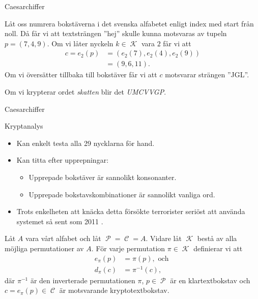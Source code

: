 \documentclass{beamer}
\theoremstyle{definition}
\DeclareMathOperator{\p}{\mathcal{P}}
\let\P\p
\DeclareMathOperator{\C}{\mathcal{C}}
\DeclareMathOperator{\K}{\mathcal{K}}
\let\stoch\mathbf
\renewcommand{\p}{\stoch P}
\begin{document}
\begin{frame}{\insertsubsectionhead}{Caesarchiffer}
  \begin{example}\label{ex:shiftdef}
    Låt oss numrera bokstäverna i det svenska alfabetet enligt index med start 
    från noll.
    Då får vi att textsträngen ''hej'' skulle kunna motsvaras av tupeln \(p 
    = (7, 4, 9)\).
    Om vi låter nyckeln \(k\in \K\) vara \(2\) får vi att
    \begin{align}
      \nonumber
      c = e_2(p) &= (e_2(7), e_2(4), e_2(9)) \\
      \nonumber
        &= (9, 6, 11).
    \end{align}
    Om vi översätter tillbaka till bokstäver får vi att \(c\) motsvarar 
    strängen ''JGL''.
  \end{example}

  \begin{example}
    \label{ex:CaesarSkatten}
    Om vi krypterar ordet \emph{skatten} blir det \emph{UMCVVGP}.
  \end{example}
\end{frame}

\begin{frame}{\insertsubsectionhead}{Caesarchiffer}
  \begin{block}{Kryptanalys}
    \begin{itemize}
      \item Kan enkelt testa alla 29 nycklarna för hand.

      \item Kan titta efter upprepningar:
        \begin{itemize}
          \item Upprepade bokstäver är sannolikt konsonanter.
          \item Upprepade bokstavskombinationer är sannolikt vanliga ord.
        \end{itemize}

      \item Trots enkelheten att knäcka detta försökte terrorister seriöst att 
        använda systemet så sent som 2011 \cite{Register2011bjr}.

    \end{itemize}
  \end{block}
\end{frame}

\begin{frame}{\insertsubsectionhead}
  \begin{definition}[Substitutionschiffer]\label{def:substitutionCipher}
    Låt \(A\) vara vårt alfabet och låt \(\P = \C = A\).
    Vidare låt \(\K\) bestå av alla möjliga permutationer av \(A\).
    För varje permutation \(\pi\in \K\) definierar vi att
    \begin{align}
      \nonumber
      e_\pi(p) &= \pi(p), \text{ och } \\
      \nonumber
      d_\pi(c) &= \pi^{-1}(c),
    \end{align}
    där \(\pi^{-1}\) är den inverterade permutationen \(\pi\), \(p\in \P\) är 
    en klartextbokstav och \(c = e_\pi(p)\in \C\) är motsvarande 
    kryptotextbokstav.
  \end{definition}
\end{frame}
\end{document}
